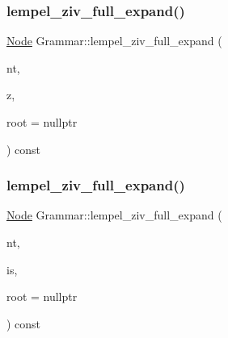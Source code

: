 \subsubsection{\texorpdfstring{lempel\+\_\+ziv\+\_\+full\+\_\+expand()}{lempel\_ziv\_full\_expand()}\hspace{0.1cm}{\footnotesize\ttfamily [1/2]}}
{\footnotesize\ttfamily \hyperlink{class_node}{Node} Grammar\+::lempel\+\_\+ziv\+\_\+full\+\_\+expand (\begin{DoxyParamCaption}\item[{\hyperlink{_nonterminal_8h_a5c1f658dc7560600a16d22408bd716ca}{nonterminal\+\_\+t}}]{nt,  }\item[{\hyperlink{_numerics_8h_a9fe2bbca873b046b2bd276fc6856bb88}{enumerationidx\+\_\+t}}]{z,  }\item[{\hyperlink{class_node}{Node} $\ast$}]{root = {\ttfamily nullptr} }\end{DoxyParamCaption}) const\hspace{0.3cm}{\ttfamily [inline]}}

\mbox{\label{class_grammar_a98fd19c7b9c1d92c59365a693ec12547}} 
\subsubsection{\texorpdfstring{lempel\+\_\+ziv\+\_\+full\+\_\+expand()}{lempel\_ziv\_full\_expand()}\hspace{0.1cm}{\footnotesize\ttfamily [2/2]}}
{\footnotesize\ttfamily \hyperlink{class_node}{Node} Grammar\+::lempel\+\_\+ziv\+\_\+full\+\_\+expand (\begin{DoxyParamCaption}\item[{\hyperlink{_nonterminal_8h_a5c1f658dc7560600a16d22408bd716ca}{nonterminal\+\_\+t}}]{nt,  }\item[{\hyperlink{class_integerized_stack}{Integerized\+Stack} \&}]{is,  }\item[{\hyperlink{class_node}{Node} $\ast$}]{root = {\ttfamily nullptr} }\end{DoxyParamCaption}) const\hspace{0.3cm}{\ttfamily [inline]}}

\mbox{\label{class_grammar_a11f1788026f68e7ddb7fca1ec04915f5}} 
